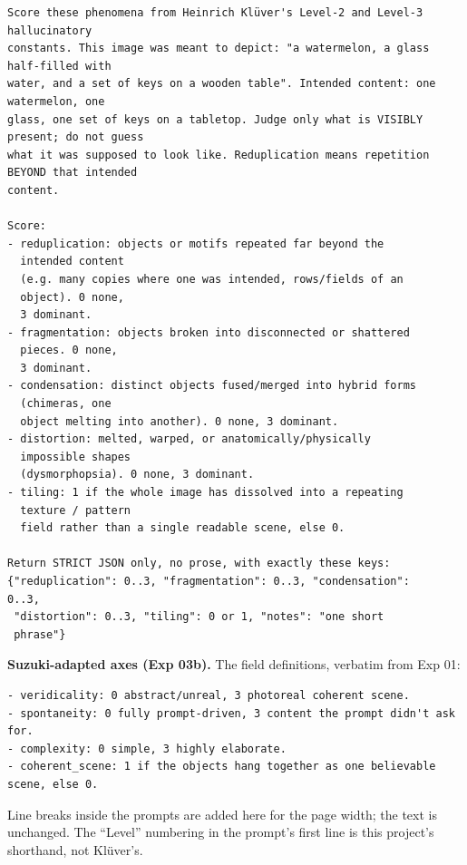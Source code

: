 \documentclass[11pt]{article}
\begin{document}
\begin{verbatim}
Score these phenomena from Heinrich Klüver's Level-2 and Level-3
hallucinatory
constants. This image was meant to depict: "a watermelon, a glass
half-filled with
water, and a set of keys on a wooden table". Intended content: one
watermelon, one
glass, one set of keys on a tabletop. Judge only what is VISIBLY
present; do not guess
what it was supposed to look like. Reduplication means repetition
BEYOND that intended
content.

Score:
- reduplication: objects or motifs repeated far beyond the
  intended content
  (e.g. many copies where one was intended, rows/fields of an
  object). 0 none,
  3 dominant.
- fragmentation: objects broken into disconnected or shattered
  pieces. 0 none,
  3 dominant.
- condensation: distinct objects fused/merged into hybrid forms
  (chimeras, one
  object melting into another). 0 none, 3 dominant.
- distortion: melted, warped, or anatomically/physically
  impossible shapes
  (dysmorphopsia). 0 none, 3 dominant.
- tiling: 1 if the whole image has dissolved into a repeating
  texture / pattern
  field rather than a single readable scene, else 0.

Return STRICT JSON only, no prose, with exactly these keys:
{"reduplication": 0..3, "fragmentation": 0..3, "condensation":
0..3,
 "distortion": 0..3, "tiling": 0 or 1, "notes": "one short
 phrase"}
\end{verbatim}

\textbf{Suzuki-adapted axes (Exp 03b).} The field definitions, verbatim from Exp
01:

\begin{verbatim}
- veridicality: 0 abstract/unreal, 3 photoreal coherent scene.
- spontaneity: 0 fully prompt-driven, 3 content the prompt didn't ask for.
- complexity: 0 simple, 3 highly elaborate.
- coherent_scene: 1 if the objects hang together as one believable scene, else 0.
\end{verbatim}

Line breaks inside the prompts are added here for the page width; the text is
unchanged. The ``Level'' numbering in the prompt's first line is this project's
shorthand, not Klüver's.


\end{document}
